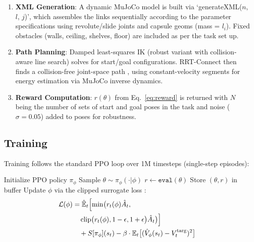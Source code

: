 \documentclass[letterpaper, 10 pt, conference]{ieeeconf}  %
\begin{document}
\begin{enumerate}
    \item \textbf{XML Generation}: A dynamic MuJoCo model is built via `generateXML($n$, $l$, $j$)', which assembles the links sequentially according to the parameter specifications using revolute/slide joints and capsule geoms (mass = $l_i$). Fixed obstacles (walls, ceiling, shelves, floor) are included as per the task set up.
    \item \textbf{Path Planning}: Damped least-squares IK (robust variant with collision-aware line search) solves for start/goal configurations. RRT-Connect then finds a collision-free joint-space path \cite{kuffner2000rrt}, using constant-velocity segments for energy estimation via MuJoCo inverse dynamics.
    \item \textbf{Reward Computation}: \(r(\theta)\) from Eq.~\eqref{eq:reward} is returned with \(N\) being the number of sets of start and goal poses in the task and noise (\(\sigma=0.05\)) added to poses for robustness.
\end{enumerate}

\subsection{Training}

Training follows the standard PPO loop over 1M timesteps (single-step episodes):

\begin{algorithm}[H]
\caption{PMorph Training}
\label{alg:train}
\begin{algorithmic}[1]
\State Initialize PPO policy \(\pi_\phi\)
    \State Sample \(\theta \sim \pi_\phi(\cdot|\phi)\)
    \State \(r \gets \texttt{eval}(\theta)\) 
    \State Store \((\theta, r)\) in buffer
    \State Update \(\phi\) via the clipped surrogate loss \cite{schulman2017proximal}:
    \[
    \begin{aligned}
    \mathcal{L}(\phi) &= \hat{\mathbb{E}}_t \Bigl[ 
        \min\bigl( r_t(\phi) \hat{A}_t,\; \\
        &\quad \operatorname{clip}\bigl(r_t(\phi), 1-\epsilon, 1+\epsilon\bigr) \hat{A}_t \bigr) \Bigr] \\
        &\quad + S[\pi_\phi](s_t) - \beta \cdot \mathbb{E}_t \bigl[ (\hat{V}_\phi(s_t) - V_t^{\text{targ}})^2 \bigr]
    \end{aligned}
    \]
\EndFor
\end{algorithmic}
\end{algorithm}
\end{document}
